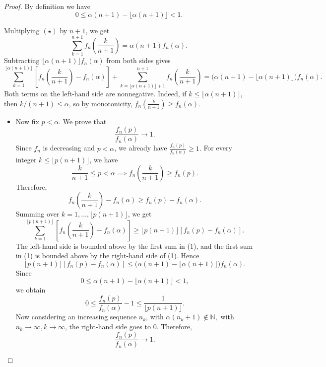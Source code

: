 \documentclass{article}
\theoremstyle{plain}
\theoremstyle{definition}
\theoremstyle{remark}
\begin{document}
\begin{proof}
By definition we have
\[
0\le \alpha(n+1)-\lfloor \alpha(n+1)\rfloor<1.
\]

Multiplying \((\star)\) by \(n+1\), we get
\[
\sum_{k=1}^{n+1}
f_n\!\left(\frac{k}{n+1}\right)
=
\alpha(n+1)f_n(\alpha).
\]
Subtracting \(\lfloor \alpha(n+1)\rfloor f_n(\alpha)\) from both sides gives
\[
\sum_{k=1}^{\lfloor \alpha(n+1)\rfloor}
\left[
f_n\!\left(\frac{k}{n+1}\right)-f_n(\alpha)
\right]
+
\sum_{k=\lfloor \alpha(n+1)\rfloor+1}^{n+1}
f_n\!\left(\frac{k}{n+1}\right)
=
\bigl(\alpha(n+1)-\lfloor \alpha(n+1)\rfloor\bigr)f_n(\alpha).
\tag{1}
\]
Both terms on the left-hand side are nonnegative. Indeed, if
\(k\le \lfloor \alpha(n+1)\rfloor\), then \(k/(n+1)\le \alpha\), so by monotonicity,
$f_n\!\left(\frac{k}{n+1}\right)\ge f_n(\alpha).$

\begin{itemize}
    \item Now fix \(p<\alpha\). We prove that
    \[
    \frac{f_n(p)}{f_n(\alpha)}\to 1.
    \]
    Since \(f_n\) is decreasing and \(p<\alpha\), we already have
    $\frac{f_n(p)}{f_n(\alpha)}\ge 1.$
    For every integer \(k\le \lfloor p(n+1)\rfloor\), we have
    \[
    \frac{k}{n+1}\le p<\alpha
    \implies
    f_n\!\left(\frac{k}{n+1}\right)\ge f_n(p).
    \]
    Therefore,
    \[
    f_n\!\left(\frac{k}{n+1}\right)-f_n(\alpha)
    \ge
    f_n(p)-f_n(\alpha).
    \]
    Summing over \(k=1,\dots,\lfloor p(n+1)\rfloor\), we get
    \[
    \sum_{k=1}^{\lfloor p(n+1)\rfloor}
    \left[
    f_n\!\left(\frac{k}{n+1}\right)-f_n(\alpha)
    \right]
    \ge
    \lfloor p(n+1)\rfloor
    \left[
    f_n(p)-f_n(\alpha)
    \right].
    \]
    The left-hand side is bounded above by the first sum in (1), and the
    first sum in (1) is bounded above by the right-hand side of (1).
    Hence
    \[
    \lfloor p(n+1)\rfloor
    \left[
    f_n(p)-f_n(\alpha)
    \right]
    \le
    \bigl(\alpha(n+1)-\lfloor \alpha(n+1)\rfloor\bigr)f_n(\alpha).
    \]
    Since
    \[
    0\le \alpha(n+1)-\lfloor \alpha(n+1)\rfloor<1,
    \]
    we obtain
    \[
    0
    \le
    \frac{f_n(p)}{f_n(\alpha)}-1
    \le
    \frac{1}{\lfloor p(n+1)\rfloor}.
    \]
    Now considering an  increasing sequence $n_k$, with $\alpha(n_k+1)\notin \mathbb{N},$ with $ n_k\to\infty, k\to \infty$, the right-hand side goes to \(0\). Therefore,
    \[
    \frac{f_n(p)}{f_n(\alpha)}\to 1.
    \]


\end{itemize}
\end{proof}
\end{document}
